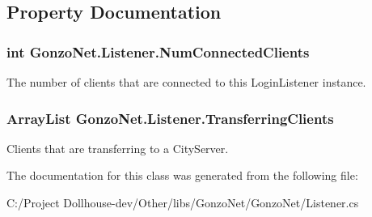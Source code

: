 \subsection{Property Documentation}
\hypertarget{class_gonzo_net_1_1_listener_a7a504c01b6b60b72846db483ac45de22}{
\subsubsection[{Num\+Connected\+Clients}]{\setlength{\rightskip}{0pt plus 5cm}int Gonzo\+Net.\+Listener.\+Num\+Connected\+Clients\hspace{0.3cm}{\ttfamily [get]}}}\label{class_gonzo_net_1_1_listener_a7a504c01b6b60b72846db483ac45de22}


The number of clients that are connected to this Login\+Listener instance. 

\hypertarget{class_gonzo_net_1_1_listener_a7e3a4dcd410cd2fa3e04509a4759d789}{
\subsubsection[{Transferring\+Clients}]{\setlength{\rightskip}{0pt plus 5cm}Array\+List Gonzo\+Net.\+Listener.\+Transferring\+Clients\hspace{0.3cm}{\ttfamily [get]}}}\label{class_gonzo_net_1_1_listener_a7e3a4dcd410cd2fa3e04509a4759d789}


Clients that are transferring to a City\+Server. 



The documentation for this class was generated from the following file\+:\begin{DoxyCompactItemize}
\item 
C\+:/\+Project Dollhouse-\/dev/\+Other/libs/\+Gonzo\+Net/\+Gonzo\+Net/Listener.\+cs\end{DoxyCompactItemize}
